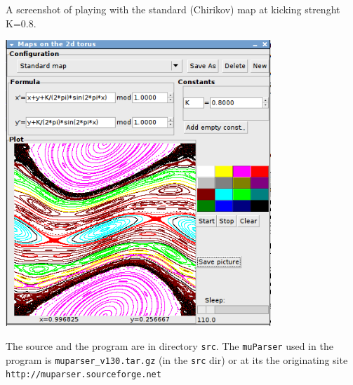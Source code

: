 \documentclass[11pt]{article}
\begin{document}
A screenshot of playing with the standard (Chirikov) map at kicking strenght K=0.8.

\begin{center}
\includegraphics[width=10cm]{screen.png}
\end{center}

The source and the program are in directory \verb|src|. The {\tt muParser} used in the program is \verb|muparser_v130.tar.gz| (in the \verb|src| dir)  or at its the originating site \verb|http://muparser.sourceforge.net|
\end{document}
